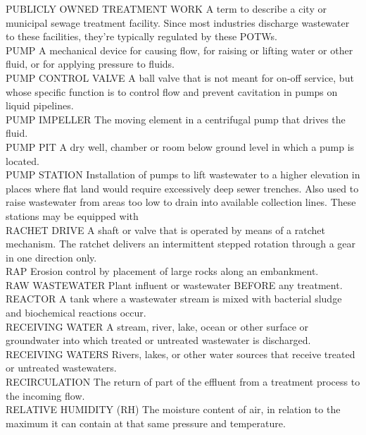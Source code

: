 \documentclass{article}
\begin{document}
PUBLICLY OWNED TREATMENT WORK
A term to describe a city or municipal sewage treatment facility. Since most industries discharge wastewater to these facilities, they’re typically regulated by these POTWs.
\vspace{0.3cm}\\
PUMP
A mechanical device for causing flow, for raising or lifting water or other fluid, or for applying pressure to fluids. 
\vspace{0.3cm}\\
PUMP CONTROL VALVE
A ball valve that is not meant for on-off service, but whose specific function is to control flow and prevent cavitation in pumps on liquid pipelines.
\vspace{0.3cm}\\
PUMP IMPELLER
The moving element in a centrifugal pump that drives the fluid.
\vspace{0.3cm}\\
PUMP PIT
A dry well, chamber or room below ground level in which a pump is located. 
\vspace{0.3cm}\\
PUMP STATION
Installation of pumps to lift wastewater to a higher elevation in places where flat land would require excessively deep sewer trenches. Also used to raise wastewater from areas too low to drain into available collection lines. These stations may be equipped with 
\vspace{0.3cm}\\
RACHET DRIVE
A shaft or valve that is operated by means of a ratchet mechanism. The ratchet delivers an intermittent stepped rotation through a gear in one direction only.
\vspace{0.3cm}\\
RAP
Erosion control by placement of large rocks along an embankment.
\vspace{0.3cm}\\
RAW WASTEWATER
Plant influent or wastewater BEFORE any treatment.
\vspace{0.3cm}\\
REACTOR
A tank where a wastewater stream is mixed with bacterial sludge and biochemical reactions occur.
\vspace{0.3cm}\\
RECEIVING WATER
A stream, river, lake, ocean or other surface or groundwater into which treated or untreated wastewater is discharged.
\vspace{0.3cm}\\
RECEIVING WATERS
Rivers, lakes, or other water sources that receive treated or untreated wastewaters.
\vspace{0.3cm}\\
RECIRCULATION
The return of part of the effluent from a treatment process to the incoming flow.
\vspace{0.3cm}\\
RELATIVE HUMIDITY (RH)
The moisture content of air, in relation to the maximum it can contain at that same pressure and temperature.
\vspace{0.3cm}\\
\end{document}
